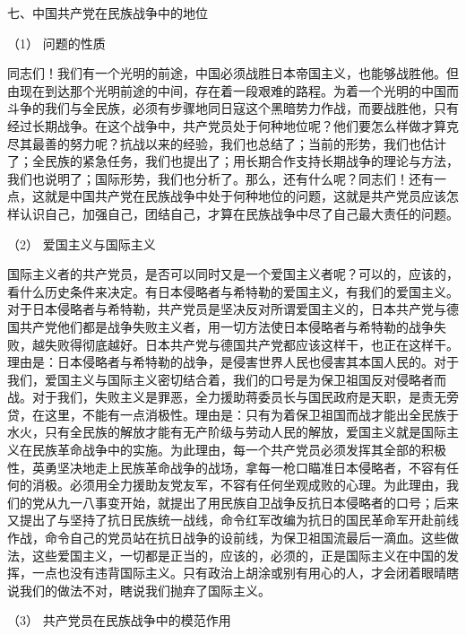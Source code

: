 \documentclass[UTF8, 12pt, a4paper]{ctexrep}
\begin{document}
七、中国共产党在民族战争中的地位

（1） 问题的性质

同志们！我们有一个光明的前途，中国必须战胜日本帝国主义，也能够战胜他。但由现在到达那个光明前途的中间，存在着一段艰难的路程。为着一个光明的中国而斗争的我们与全民族，必须有步骤地同日寇这个黑暗势力作战，而要战胜他，只有经过长期战争。在这个战争中，共产党员处于何种地位呢？他们要怎么样做才算克尽其最善的努力呢？抗战以来的经验，我们也总结了；当前的形势，我们也估计了；全民族的紧急任务，我们也提出了；用长期合作支持长期战争的理论与方法，我们也说明了；国际形势，我们也分析了。那么，还有什么呢？同志们！还有一点，这就是中国共产党在民族战争中处于何种地位的问题，这就是共产党员应该怎样认识自己，加强自己，团结自己，才算在民族战争中尽了自己最大责任的问题。

（2） 爱国主义与国际主义

国际主义者的共产党员，是否可以同时又是一个爱国主义者呢？可以的，应该的，看什么历史条件来决定。有日本侵略者与希特勒的爱国主义，有我们的爱国主义。对于日本侵略者与希特勒，共产党员是坚决反对所谓爱国主义的，日本共产党与德国共产党他们都是战争失败主义者，用一切方法使日本侵略者与希特勒的战争失败，越失败得彻底越好。日本共产党与德国共产党都应该这样干，也正在这样干。理由是：日本侵略者与希特勒的战争，是侵害世界人民也侵害其本国人民的。对于我们，爱国主义与国际主义密切结合着，我们的口号是为保卫祖国反对侵略者而战。对于我们，失败主义是罪恶，全力援助蒋委员长与国民政府是天职，是责无旁贷，在这里，不能有一点消极性。理由是：只有为着保卫祖国而战才能出全民族于水火，只有全民族的解放才能有无产阶级与劳动人民的解放，爱国主义就是国际主义在民族革命战争中的实施。为此理由，每一个共产党员必须发挥其全部的积极性，英勇坚决地走上民族革命战争的战场，拿每一枪口瞄准日本侵略者，不容有任何的消极。必须用全力援助友党友军，不容有任何坐观成败的心理。为此理由，我们的党从九一八事变开始，就提出了用民族自卫战争反抗日本侵略者的口号；后来又提出了与坚持了抗日民族统一战线，命令红军改编为抗日的国民革命军开赴前线作战，命令自己的党员站在抗日战争的设前线，为保卫祖国流最后一滴血。这些做法，这些爱国主义，一切都是正当的，应该的，必须的，正是国际主义在中国的发挥，一点也没有违背国际主义。只有政治上胡涂或别有用心的人，才会闭着眼晴瞎说我们的做法不对，瞎说我们抛弃了国际主义。

（3） 共产党员在民族战争中的模范作用
\end{document}
